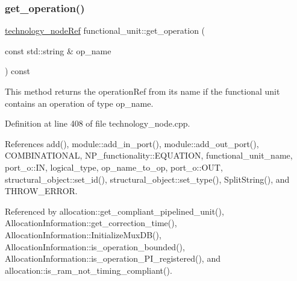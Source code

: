 \subsubsection{\texorpdfstring{get\+\_\+operation()}{get\_operation()}}
{\footnotesize\ttfamily \hyperlink{technology__node_8hpp_a33dd193b7bd6b987bf0d8a770a819fa7}{technology\+\_\+node\+Ref} functional\+\_\+unit\+::get\+\_\+operation (\begin{DoxyParamCaption}\item[{const std\+::string \&}]{op\+\_\+name }\end{DoxyParamCaption}) const}



This method returns the operation\+Ref from its name if the functional unit contains an operation of type op\+\_\+name. 



Definition at line 408 of file technology\+\_\+node.\+cpp.



References add(), module\+::add\+\_\+in\+\_\+port(), module\+::add\+\_\+out\+\_\+port(), C\+O\+M\+B\+I\+N\+A\+T\+I\+O\+N\+AL, N\+P\+\_\+functionality\+::\+E\+Q\+U\+A\+T\+I\+ON, functional\+\_\+unit\+\_\+name, port\+\_\+o\+::\+IN, logical\+\_\+type, op\+\_\+name\+\_\+to\+\_\+op, port\+\_\+o\+::\+O\+UT, structural\+\_\+object\+::set\+\_\+id(), structural\+\_\+object\+::set\+\_\+type(), Split\+String(), and T\+H\+R\+O\+W\+\_\+\+E\+R\+R\+OR.



Referenced by allocation\+::get\+\_\+compliant\+\_\+pipelined\+\_\+unit(), Allocation\+Information\+::get\+\_\+correction\+\_\+time(), Allocation\+Information\+::\+Initialize\+Mux\+D\+B(), Allocation\+Information\+::is\+\_\+operation\+\_\+bounded(), Allocation\+Information\+::is\+\_\+operation\+\_\+\+P\+I\+\_\+registered(), and allocation\+::is\+\_\+ram\+\_\+not\+\_\+timing\+\_\+compliant().

